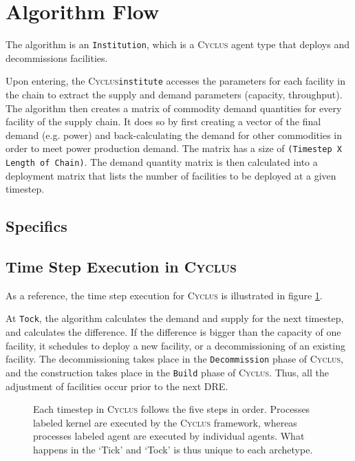 \documentclass[11pt,letterpaper]{article}
\newcommand{\Cyclus}{\textsc{Cyclus}\xspace}%
\begin{document}
\section{Algorithm Flow}

The algorithm is an \texttt{Institution}, which is a \Cyclus agent type
that deploys and decommissions facilities.

Upon entering, the \Cyclus \texttt{institute} accesses the parameters for each
facility in the chain to extract the supply and demand parameters (capacity, throughput).
The algorithm then creates a matrix of commodity demand quantities for every
facility of the supply chain. It does so by first creating a vector
of the final demand (e.g. power) and back-calculating the demand for other
commodities in order to meet power production demand.
The matrix has a size of \texttt{(Timestep X Length of Chain)}.
The demand quantity matrix is then calculated into a deployment matrix that
lists the number of facilities to be deployed at a given timestep.


\subsection{Specifics}


\subsection{Time Step Execution in \Cyclus}
As a reference, the time step execution for \Cyclus is illustrated in figure \ref{diag:time}.

At \texttt{Tock}, the algorithm calculates the demand and supply for the next timestep, and calculates
the difference. If the difference is bigger than the capacity of one facility, it
schedules to deploy a new facility, or a decommissioning of an existing facility.
The decommissioning takes place in the \texttt{Decommission} phase of \Cyclus, and
the construction takes place in the \texttt{Build} phase of \Cyclus. Thus, all the
adjustment of facilities occur prior to the next \gls{DRE}.


\begin{figure}[H]
\centering
{}
\caption{Each timestep in \Cyclus follows the five steps in order. Processes labeled
         kernel are executed by the \Cyclus framework, whereas processes labeled agent
         are executed by individual agents. What happens in the `Tick' and `Tock' is
         thus unique to each archetype.}
\label{diag:time}
\end{figure}
\end{document}
